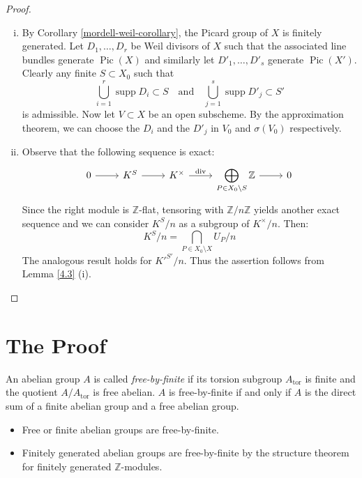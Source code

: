 \begin{proof}
\begin{enumerate}[(i)]
\item By Corollary \ref{mordell-weil-corollary}, the Picard group of $X$ is finitely generated. Let $D_1,\ldots, D_r$ be Weil divisors of $X$ such that the associated line bundles generate $\operatorname{Pic}(X)$ and similarly let $D'_1,\ldots,D'_s$ generate $\operatorname{Pic}(X')$. Clearly any finite $S\subset X_0$ such that
\[ \bigcup_{i=1}^r \operatorname{supp}D_i\subset S\quad\text{and}\quad \bigcup_{j=1}^s\operatorname{supp}D'_j\subset S' \]
is admissible. Now let $V\subset X$ be an open subscheme. By the approximation theorem, we can choose the $D_i$ and the $D'_j$ in $V_0$ and $\sigma (V_0)$ respectively.
\item Observe that the following sequence is exact:
\[ \begin{tikzcd}
0 \ar[r] & K^S \ar[r]& K^\times \ar[r, "\operatorname{div}"]& \displaystyle \bigoplus_{P\in X_0\setminus S}\mathbb{Z} \ar[r]& 0
\end{tikzcd} \]
Since the right module is $\mathbb{Z}$-flat, tensoring with $\mathbb{Z}/n\mathbb{Z}$ yields another exact sequence and we can consider $K^S/n$ as a subgroup of $K^\times/n$. Then:
\[ K^S/n = \bigcap_{P\in X_0\setminus X}U_P/n \]
The analogous result holds for $K'^{S'}/n$. Thus the assertion follows from Lemma \ref{4.3} (i).\qedhere
\end{enumerate}
\end{proof}

\section{The Proof}

\begin{definition}\label{5.1}
An abelian group $A$ is called \textit{free-by-finite} if its torsion subgroup $A_\text{tor}$ is finite and the quotient $A/A_\text{tor}$ is free abelian. $A$ is free-by-finite if and only if $A$ is the direct sum of a finite abelian group and a free abelian group.
\end{definition}

\begin{example}
\begin{itemize}
\item Free or finite abelian groups are free-by-finite.
\item Finitely generated abelian groups are free-by-finite by the structure theorem for finitely generated $\mathbb{Z}$-modules.
\end{itemize}
\end{example}

